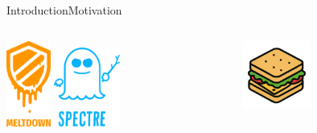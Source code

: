 \documentclass[aspectratio=169, hyperref={colorlinks=true, allcolors=SecondaryColor}, c]{beamer}
\begin{document}
\begin{frame}[fragile]{Introduction}{Motivation}
	\begin{columns}
		\begin{column}[t]{0.5\textwidth}
			\begin{center}
				\includegraphics[width=0.2\textwidth]{./figures/meltdown.png}\hspace{0.4cm}\cite{MeltdownSecurityVulnerability2024}
				\hspace{0.5cm}
				\includegraphics[width=0.3\textwidth]{./figures/spectre.png}\cite{SpectreSecurityVulnerability2025}
			\end{center}
		\end{column}
		\begin{column}[t]{0.5\textwidth}
			\begin{center}
				\includegraphics[width=0.4\textwidth]{./figures/sandwich_alpha.png}
			\end{center}
		\end{column}

\end{columns}
\end{frame}
\end{document}
